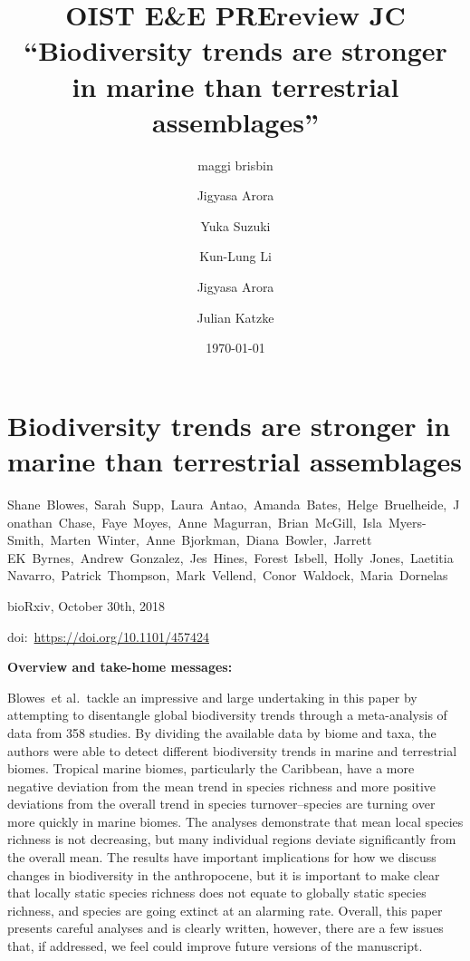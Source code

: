 \documentclass[10pt]{article}
\begin{document}
\title{OIST E\&E PREreview JC ``Biodiversity trends are stronger in marine than
terrestrial assemblages''}



\author[1]{maggi brisbin}%
\author[1]{Jigyasa Arora}%
\author[1]{Yuka Suzuki}%
\author[1]{Kun-Lung Li}%
\author[1]{Jigyasa Arora}%
\author[1]{Julian Katzke}%
%


\vspace{-1em}



  \date{\today}


\begingroup
\let\center\flushleft
\let\endcenter\endflushleft
\maketitle
\endgroup









\section*{Biodiversity trends are stronger in marine than terrestrial
assemblages}

{\label{196514}}

Shane~Blowes,~Sarah~Supp,~Laura~Antao,~Amanda~Bates,~Helge~Bruelheide,~Jonathan~Chase,~Faye~Moyes,~Anne~Magurran,~Brian~McGill,~Isla~Myers-Smith,~Marten~Winter,~Anne~Bjorkman,~Diana~Bowler,~Jarrett
EK~Byrnes,~Andrew~Gonzalez,~Jes~Hines,~Forest~Isbell,~Holly~Jones,~Laetitia~Navarro,~Patrick~Thompson,~Mark~Vellend,~Conor~Waldock,~Maria~Dornelas

bioRxiv, October 30th, 2018

doi:~\url{https://doi.org/10.1101/457424}

\par\null

\textbf{Overview and take-home messages:}

Blowes~et al\emph{.~}tackle an impressive and large undertaking in this
paper by attempting to disentangle global biodiversity trends through a
meta-analysis of data from 358 studies. By dividing the available data
by biome and taxa, the authors were able to detect different
biodiversity trends in marine and terrestrial biomes. Tropical marine
biomes, particularly the Caribbean, have a more negative deviation from
the mean trend in species richness and more positive deviations from the
overall trend in species turnover--species are turning over more quickly
in marine biomes. The analyses demonstrate that mean local species
richness is not decreasing, but many individual regions deviate
significantly from the overall mean. The results have important
implications for how we discuss changes in biodiversity in the
anthropocene, but it is important to make clear that locally static
species richness does not equate to globally static species richness,
and species are going extinct at an alarming rate. Overall, this paper
presents careful analyses and is clearly written, however, there are a
few issues that, if addressed, we feel could improve future versions of
the manuscript.~~
\end{document}
